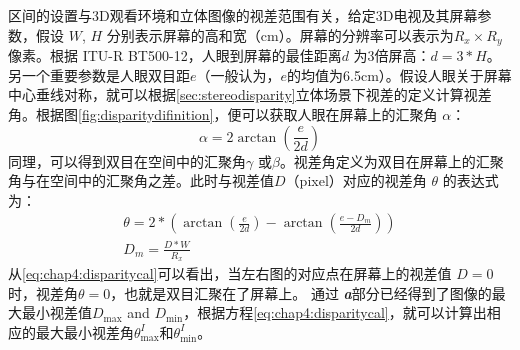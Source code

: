 \\[0.2cm]
\\[0.2cm]
区间的设置与3D观看环境和立体图像的视差范围有关，给定3D电视及其屏幕参数，假设 $W$, $H$ 分别表示屏幕的高和宽（cm）。屏幕的分辨率可以表示为${R_x}\times{R_y}$像素。根据 ITU-R BT500-12\parencite{itu500,}，人眼到屏幕的最佳距离$d$ 为3倍屏高：$d = 3*H$。另一个重要参数是人眼双目距$e$（一般认为，$e$的均值为6.5cm）。假设人眼关于屏幕中心垂线对称，就可以根据\ref{sec:stereodisparity}立体场景下视差的定义计算视差角。根据图\ref{fig:disparitydifinition}，便可以获取人眼在屏幕上的汇聚角 $\alpha$：
\begin{equation}
{\alpha  = 2\arctan (\frac{e}{{2d}})}
\end{equation}
同理，可以得到双目在空间中的汇聚角$\gamma$ 或$\beta$。视差角定义为双目在屏幕上的汇聚角与在空间中的汇聚角之差。此时与视差值$D$（pixel）对应的视差角 $\theta$ 的表达式为：
\begin{equation}
\label{eq:chap4:disparitycal}
\begin{array}{l}
\theta  = 2*(\arctan (\frac{e}{{2d}}) - \arctan (\frac{{e - {D_m}}}{{2d}}))\\
{D_m} = \frac{{D*W}}{{{R_x}}}
\end{array}
\end{equation}
从\ref{eq:chap4:disparitycal}可以看出，当左右图的对应点在屏幕上的视差值  $D=0$时，视差角$\theta=0$，也就是双目汇聚在了屏幕上。
通过 \textbf{\emph{a}}部分已经得到了图像的最大最小视差值${D_{\max}}$  and ${D_{\min}}$，根据方程\ref{eq:chap4:disparitycal}，就可以计算出相应的最大最小视差角$\theta _{\max }^I$和$\theta _{\min }^I$。

